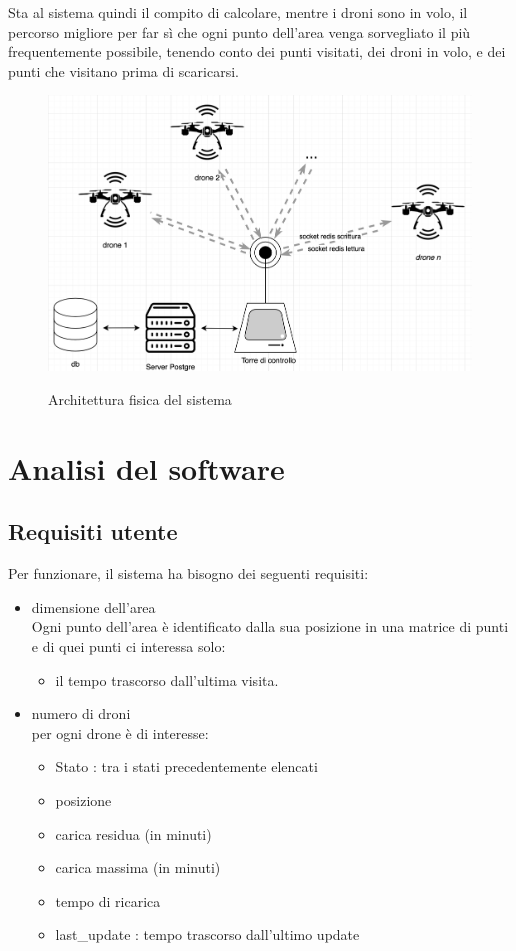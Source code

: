 \documentclass[a4paper, 11pt]{article}
\begin{document}
Sta al sistema quindi il compito di calcolare, mentre i droni sono in volo, il percorso migliore per far sì che ogni punto dell'area venga sorvegliato 
il più frequentemente possibile, tenendo conto dei punti visitati, dei droni in volo, e dei punti che visitano prima di scaricarsi.
\begin{figure}[h]
    \centering
    \includegraphics[height = 7.2 cm]{image/Architettura.png}\\
    \caption{Architettura fisica del sistema}
\end{figure}
\newpage

\section{Analisi del software}
\subsection{Requisiti utente}
Per funzionare, il sistema ha bisogno dei seguenti requisiti:
\begin{itemize}
    \item dimensione dell'area\\
    Ogni punto dell'area è identificato dalla sua posizione in una matrice di punti e di quei punti ci interessa solo:
    \begin{itemize}
        \item il tempo trascorso dall'ultima visita.
    \end{itemize}
    \item numero di droni\\
    per ogni drone è di interesse:
    \begin{itemize}
        \item Stato : tra i stati precedentemente elencati
        \item posizione 
        \item carica residua (in minuti)
        \item carica massima (in minuti)
        \item tempo di ricarica 
        \item last\_update : tempo trascorso dall'ultimo update
    \end{itemize}
    
\end{itemize}
\end{document}
